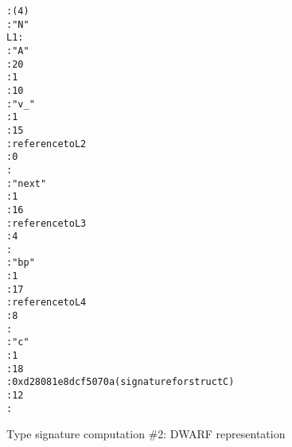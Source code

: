 \begin{figure}
\begin{dwflisting}
\begin{alltt}
  \DWTAGtypeunit
      \DWATlanguage : \DWLANGCplusplus (4)
    \DWTAGnamespace
        \DWATname : "N"
L1:
        \DWTAGclasstype
             \DWATname : "A"
             \DWATbytesize : 20
             \DWATdeclfile : 1
             \DWATdeclline : 10
           \DWTAGmember
                \DWATname : "v\_"
                \DWATdeclfile : 1
                \DWATdeclline : 15
                \DWATtype : reference to L2
                \DWATdatamemberlocation : 0
                \DWATaccessibility : \DWACCESSprivate
          \DWTAGmember
               \DWATname : "next"
               \DWATdeclfile : 1
               \DWATdeclline : 16
               \DWATtype : reference to L3
               \DWATdatamemberlocation : 4
               \DWATaccessibility : \DWACCESSprivate
          \DWTAGmember
               \DWATname : "bp"
               \DWATdeclfile : 1
               \DWATdeclline : 17
               \DWATtype : reference to L4
               \DWATdatamemberlocation : 8
               \DWATaccessibility : \DWACCESSprivate
          \DWTAGmember
               \DWATname : "c"
               \DWATdeclfile : 1
               \DWATdeclline : 18
               \DWATtype : 0xd28081e8 dcf5070a (signature for struct C)
               \DWATdatamemberlocation : 12
               \DWATaccessibility : \DWACCESSprivate
\end{alltt}
\end{dwflisting}
\caption{Type signature computation \#2: DWARF representation}
\label{fig:typesignaturecomputation2dwarfrepresentation}
\end{figure}

